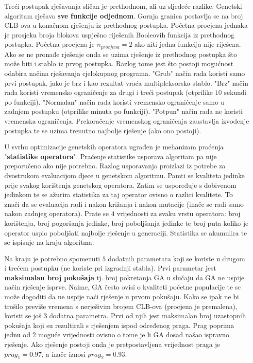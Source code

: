 \documentclass[times, utf8, diplomski]{fer}
\begin{document}
Treći postupak rješavanja sličan je prethodnom, ali uz sljedeće razlike. Genetski algoritam rješava \textbf{sve funkcije odjednom}. Gornja granica postavlja se na broj CLB-ova u konačnom rješenju iz prethodnog postupka. Početna procjena jednaka je prosjeku broja blokova uspješno riješenih Booleovih funkcija iz prethodnog postupka. Početna procjena je $n_{procjena}=2$ ako niti jedna funkcija nije riješena. Ako se ne pronađe rješenje onda se uzima rješenje iz prethodnog postupka što može biti i stablo iz prvog postupka. Razlog tome jest što postoji mogućnost odabira načina rješavanja cjelokupnog programa. "Grub" način rada koristi samo prvi postupak, jako je brz i kao rezultat vraća multipleksorsko stablo. "Brz" način rada koristi vremensko ograničenje za drugi i treći postupak (otprilike $10$ sekundi po funkciji). "Normalan" način rada koristi vremensko ograničenje samo u zadnjem postupku (otprilike minuta po funkciji). "Potpun" način rada ne koristi vremenska ograničenja. Prekoračenje vremenskog ograničenja zaustavlja izvođenje postupka te se uzima trenutno najbolje rješenje (ako ono postoji). 

U svrhu optimizacije genetskih operatora ugrađen je mehanizam praćenja "\textbf{statistike operatora}". Praćenje statistike usporava algoritam pa nije preporučeno ako nije potrebno. Razlog usporavanja proizlazi iz potrebe za dvostrukom evaluacijom djece u genetskom algoritmu. Pamti se kvaliteta jedinke prije svakog korištenja genetskog operatora. Zatim se uspoređuje s dobivenom jedinkom te se ažurira statistika za taj operator ovisno o razlici kvalitete. To znači da se evaluacija radi i nakon križanja i nakon mutacije (inače se radi samo nakon zadnjeg operatora). Prate se $4$ vrijednosti za svaku vrstu operatora: broj korištenja, broj pogoršanja jedinke, broj poboljšanja jedinke te broj puta koliko je operator uspio poboljšati najbolje rješenje u generaciji. Statistika se akumulira te se ispisuje na kraju algoritma.

Na kraju je potrebno spomenuti $5$ dodatnih parametara koji se koriste u drugom i trećem postupku (ne koriste pri izgradnji stabla). Prvi parametar jest \textbf{maksimalan broj pokušaja} tj. broj pokretanja GA u slučaju da GA ne uspije način rješenje isprve. Naime, GA često ovisi o kvaliteti početne populacije te se može dogoditi da ne uspije naći rješenje u prvom pokušaju. Kako se ipak ne bi trošilo previše vremena s nerješivim brojem CLB-ova (procjena je premalena), koristi se još $3$ dodatna parametra. Prvi od njih jest maksimalan broj uzastopnih pokušaja koji su rezultirali s rješenjem ispod određenog praga. Prag poprima jednu od $2$ moguće vrijednosti ovisno o tome je li GA dosad našao ispravno rješenje. Ako rješenje postoji onda je pretpostavljena vrijednost praga je $prag_{1}=0.97$, a inače iznosi $prag_{2}=0.93$.
\end{document}
